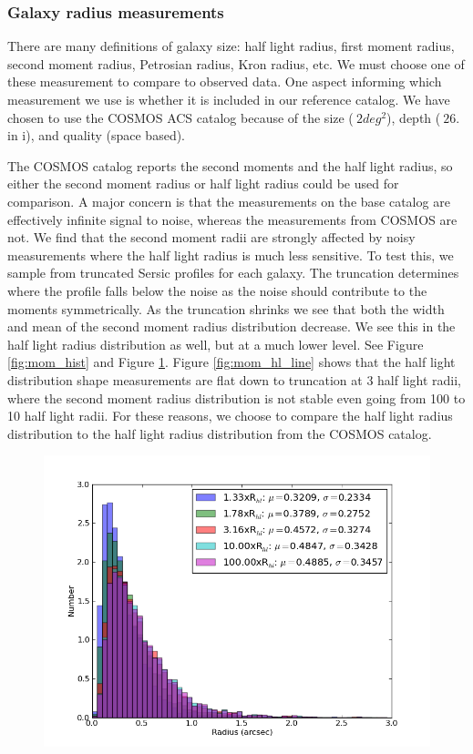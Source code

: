 \documentclass[]{article}
\begin{document}
\subsubsection{Galaxy radius measurements}
There are many definitions of galaxy size: half light radius, first moment radius, second moment radius, Petrosian radius, Kron radius, etc.
We must choose one of these measurement to compare to observed data.  One aspect informing which measurement we use is whether it is included 
in our reference catalog.  We have chosen to use the COSMOS ACS catalog \cite{cosmos} because of the size ($~2deg^2$), depth ($~26.$ in i), and
quality (space based).  

The COSMOS catalog reports the second moments and the 
half light radius, so either the second moment radius or half light radius could be used for comparison.  A major concern is that the measurements
on the base catalog are effectively infinite signal to noise, whereas the measurements from COSMOS are not.  We find that the second moment 
radii are strongly affected by noisy measurements where the half light radius is much less sensitive.  To test this, we sample from truncated Sersic
profiles for each galaxy.  The truncation determines where the profile falls below the noise as the noise should contribute to the moments symmetrically.
As the truncation shrinks we see that both the width and mean of the second moment radius distribution decrease.  We see this in the
half light radius distribution as well, but at a much lower level.  See Figure \ref{fig:mom_hist} and Figure \ref{fig:hl_hist}.  Figure
\ref{fig:mom_hl_line} shows that the half light distribution shape measurements are flat down to truncation at 3 half light radii, where 
the second moment radius distribution is not stable even going from 100 to 10 half light radii.  For these reasons, we choose to compare the half light 
radius distribution to the half light radius distribution from the COSMOS catalog.
\begin{figure}
\centering
\includegraphics[width=5in]{validation_figures/half_light_hist.png}
\caption{\label{fig:hl_hist}}
\end{figure}
\end{document}

